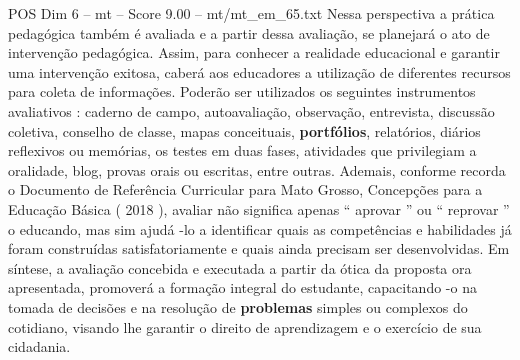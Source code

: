 \begin{textsample}{POS Dim 6 – mt – Score 9.00 – mt/mt\_em\_65.txt}
Nessa perspectiva a prática pedagógica também é avaliada e a partir dessa avaliação, se planejará o ato de intervenção pedagógica.
Assim, para conhecer a realidade educacional e garantir uma intervenção exitosa, caberá aos educadores a utilização de diferentes recursos para coleta de informações.
Poderão ser utilizados os seguintes instrumentos avaliativos : caderno de campo, autoavaliação, observação, entrevista, discussão coletiva, conselho de classe, mapas conceituais, \textbf{portfólios}, relatórios, diários reflexivos ou memórias, os testes em duas fases, atividades que privilegiam a oralidade, blog, provas orais ou escritas, entre outras.
Ademais, conforme recorda o Documento de Referência Curricular para Mato Grosso, Concepções para a Educação Básica ( 2018 ), avaliar não significa apenas “ aprovar ” ou “ reprovar ” o educando, mas sim ajudá -lo a identificar quais as competências e habilidades já foram construídas satisfatoriamente e quais ainda precisam ser desenvolvidas.
Em síntese, a avaliação concebida e executada a partir da ótica da proposta ora apresentada, promoverá a formação integral do estudante, capacitando -o na tomada de decisões e na resolução de \textbf{problemas} simples ou complexos do cotidiano, visando lhe garantir o direito de aprendizagem e o exercício de sua cidadania.

\end{textsample}
